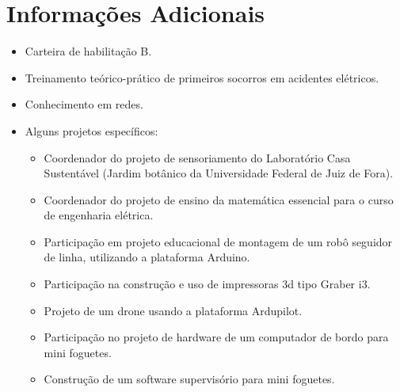 \documentclass[11pt,a4paper,sans,english]{moderncv}        %
\begin{document}
	\section{Informações Adicionais}
	\begin{itemize}
		\item Carteira de habilitação B.
		\item Treinamento teórico-prático de primeiros socorros em acidentes elétricos.
		\item Conhecimento em redes.
		\item Alguns projetos específicos:
			\begin{itemize}
				\item Coordenador do projeto de sensoriamento do Laboratório Casa Sustentável (Jardim botânico da Universidade Federal de Juiz de Fora).
				\item Coordenador do projeto de ensino da matemática essencial para o curso de engenharia elétrica.
				\item Participação em projeto educacional de montagem de um robô seguidor de linha, utilizando a plataforma Arduino.
				\item Participação na construção e uso de impressoras 3d tipo Graber i3.
				\item Projeto de um drone usando a plataforma Ardupilot.
				\item Participação no projeto de hardware de um computador de bordo para mini foguetes.
				\item Construção de um software supervisório para mini foguetes.
			\end{itemize}
	\end{itemize}
	
	
\end{document}
